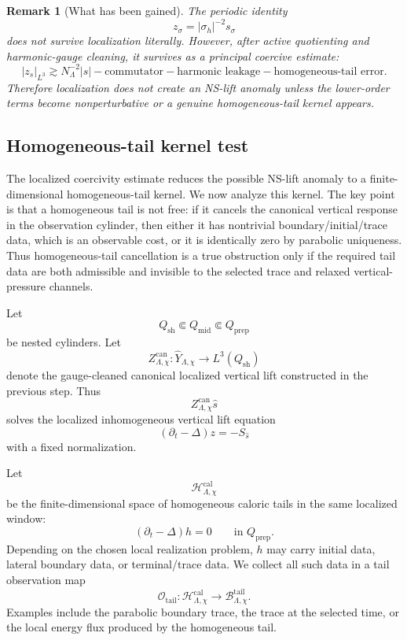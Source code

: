\documentclass[11pt]{article}
\numberwithin{equation}{section}
\newtheorem{remark}[theorem]{Remark}
\begin{document}
\begin{remark}[What has been gained]
The periodic identity
\[
z_\sigma=|\sigma_h|^{-2}s_\sigma
\]
does not survive localization literally. However, after active quotienting and harmonic-gauge cleaning, it survives as a principal coercive estimate:
\[
|z_s|_{L^3}
\gtrsim
N_\Lambda^{-2}|s|
-\text{commutator}
-\text{harmonic leakage}
-\text{homogeneous-tail error}.
\]
Therefore localization does not create an NS-lift anomaly unless the lower-order terms become nonperturbative or a genuine homogeneous-tail kernel appears.
\end{remark}

\subsection{Homogeneous-tail kernel test}

The localized coercivity estimate reduces the possible NS-lift anomaly to a finite-dimensional homogeneous-tail kernel. We now analyze this kernel. The key point is that a homogeneous tail is not free: if it cancels the canonical vertical response in the observation cylinder, then either it has nontrivial boundary/initial/trace data, which is an observable cost, or it is identically zero by parabolic uniqueness. Thus homogeneous-tail cancellation is a true obstruction only if the required tail data are both admissible and invisible to the selected trace and relaxed vertical-pressure channels.

Let
\[
Q_{\mathrm{sh}}\Subset Q_{\mathrm{mid}}\Subset Q_{\mathrm{prep}}
\]
be nested cylinders. Let
\[
Z_{\Lambda,\chi}^{\mathrm{can}}:
\widehat Y_{\Lambda,\chi}\to L^3(Q_{\mathrm{sh}})
\]
denote the gauge-cleaned canonical localized vertical lift constructed in the previous step. Thus
\[
Z_{\Lambda,\chi}^{\mathrm{can}}\widehat s
\]
solves the localized inhomogeneous vertical lift equation
\[
(\partial_t-\Delta)z=-S_{\widehat s}
\]
with a fixed normalization.

Let
\[
\mathcal H_{\Lambda,\chi}^{\mathrm{cal}}
\]
be the finite-dimensional space of homogeneous caloric tails in the same localized window:
\[
(\partial_t-\Delta)h=0
\qquad
\text{in }Q_{\mathrm{prep}}.
\]
Depending on the chosen local realization problem, \(h\) may carry initial data, lateral boundary data, or terminal/trace data. We collect all such data in a tail observation map
\[
\mathcal O_{\mathrm{tail}}:
\mathcal H_{\Lambda,\chi}^{\mathrm{cal}}
\to
\mathcal B_{\Lambda,\chi}^{\mathrm{tail}}.
\]
Examples include the parabolic boundary trace, the trace at the selected time, or the local energy flux produced by the homogeneous tail.
\end{document}
